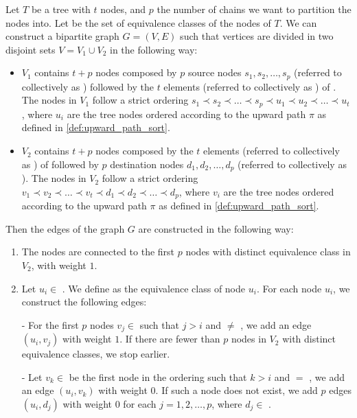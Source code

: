 \begin{definition} \label{def:bip_construction}
    Let $T$ be a tree with $t$ nodes, and $p$ the number of chains we want to partition the nodes into. Let \equivsetmath be the set of equivalence classes of the nodes of $T$. We can construct a bipartite graph $G = (V, E)$ such that vertices are divided in two disjoint sets $V = V_1 \cup V_2$ in the following way:
    \begin{itemize}
        \item $V_1$ contains $t + p$ nodes composed by $p$ source nodes $s_1, s_2, \dots, s_p$ (referred to collectively as \sourceset) followed by the $t$ elements (referred to collectively as ) of \equivsetmath. The nodes in $V_1$ follow a strict ordering $s_1 \prec s_2 \prec \dots \prec s_p \prec u_1 \prec u_2 \prec \dots \prec u_t$, where $u_i$ are the tree nodes ordered according to the upward path $\pi$ as defined in \cref{def:upward_path_sort}. 
        \item $V_2$ contains $t + p$ nodes composed by the $t$ elements (referred to collectively as ) of \equivsetmath followed by $p$ destination nodes $d_1, d_2, \dots, d_p$ (referred to collectively as \destset). The nodes in $V_2$ follow a strict ordering $v_1 \prec v_2 \prec \dots \prec v_t \prec d_1 \prec d_2 \prec \dots \prec d_p$, where $v_i$ are the tree nodes ordered according to the upward path $\pi$ as defined in \cref{def:upward_path_sort}.
    \end{itemize}

    Then the edges of the graph $G$ are constructed in the following way:
    \begin{enumerate}
        \item The \sourceset nodes are connected to the first $p$ nodes with distinct equivalence class in $V_2$, with weight $1$.
        \item Let $u_i \in$ . We define  as the equivalence class of node $u_i$. For each node $u_i$, we construct the following edges:
        
        - For the first $p$ nodes $v_j \in$  such that $j > i$ and  $\neq$ , we add an edge $(u_i, v_j)$ with weight $1$. If there are fewer than $p$ nodes in $V_2$ with distinct equivalence classes, we stop earlier.

        - Let $v_k \in$  be the first node in the ordering such that $k > i$ and  $=$ , we add an edge $(u_i, v_k)$ with weight $0$. If such a node does not exist, we add $p$ edges $(u_i, d_j)$ with weight $0$ for each $j = 1, 2, \ldots, p$, where $d_j \in$ \destset.
    \end{enumerate}
\end{definition}
